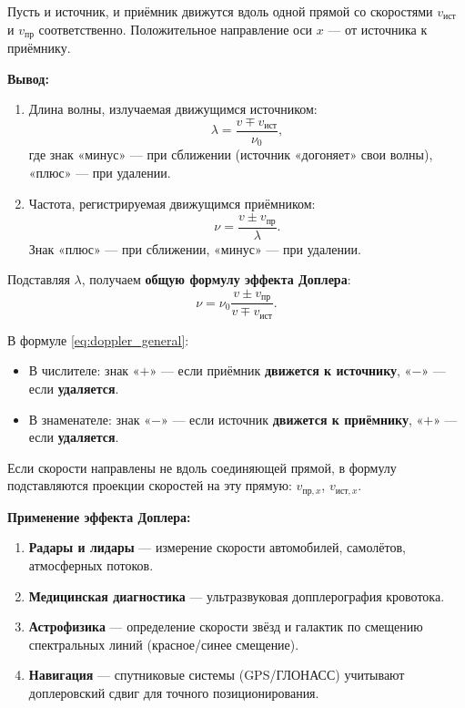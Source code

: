 \begin{theorem}
Пусть и источник, и приёмник движутся вдоль одной прямой со скоростями $v_{\text{ист}}$ и $v_{\text{пр}}$ соответственно. Положительное направление оси $x$ --- от источника к приёмнику.

\textbf{Вывод:}
\begin{enumerate}
    \item Длина волны, излучаемая движущимся источником:
    \begin{equation}
        \lambda = \frac{v \mp v_{\text{ист}}}{\nu_0},
    \end{equation}
    где знак «минус» --- при сближении (источник «догоняет» свои волны), «плюс» --- при удалении.
    \item Частота, регистрируемая движущимся приёмником:
    \begin{equation}
        \nu = \frac{v \pm v_{\text{пр}}}{\lambda}.
    \end{equation}
    Знак «плюс» --- при сближении, «минус» --- при удалении.
\end{enumerate}
Подставляя $\lambda$, получаем \textbf{общую формулу эффекта Доплера}:
\begin{equation}
    \nu = \nu_0 \frac{v \pm v_{\text{пр}}}{v \mp v_{\text{ист}}}. \label{eq:doppler_general}
\end{equation}
\end{theorem}

\begin{property}
В формуле \eqref{eq:doppler_general}:
\begin{itemize}
    \item В числителе: знак «$+$» --- если приёмник \textbf{движется к источнику}, «$-$» --- если \textbf{удаляется}.
    \item В знаменателе: знак «$-$» --- если источник \textbf{движется к приёмнику}, «$+$» --- если \textbf{удаляется}.
\end{itemize}
Если скорости направлены не вдоль соединяющей прямой, в формулу подставляются проекции скоростей на эту прямую: $v_{\text{пр},x}$, $v_{\text{ист},x}$.
\end{property}

\begin{remark}
\textbf{Применение эффекта Доплера:}
\begin{enumerate}
    \item \textbf{Радары и лидары} --- измерение скорости автомобилей, самолётов, атмосферных потоков.
    \item \textbf{Медицинская диагностика} --- ультразвуковая допплерография кровотока.
    \item \textbf{Астрофизика} --- определение скорости звёзд и галактик по смещению спектральных линий (красное/синее смещение).
    \item \textbf{Навигация} --- спутниковые системы (GPS/ГЛОНАСС) учитывают доплеровский сдвиг для точного позиционирования.
\end{enumerate}
\end{remark}

